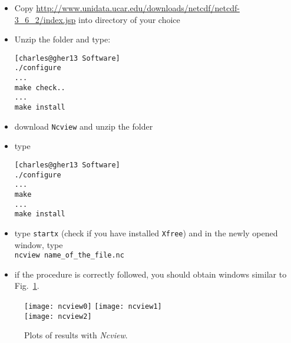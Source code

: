 \begin{itemize}
\item Copy \url{http://www.unidata.ucar.edu/downloads/netcdf/netcdf-3_6_2/index.jsp}  into directory of your choice
\item Unzip the folder  and type:
\begin{lstlisting}[style=Bash]
[charles@gher13 Software]
./configure
...
make check..
...
make install
\end{lstlisting}

\item download \texttt{Ncview} and unzip the folder
\item type\\ 
\begin{lstlisting}[style=Bash]
[charles@gher13 Software]
./configure
...
make 
...
make install
\end{lstlisting}

\item type \texttt{startx} (check if you have installed \texttt{Xfree}) and in the newly opened window, type\\
\texttt{ncview name\_of\_the\_file.nc}

\item if the procedure is correctly followed, you should obtain windows similar to Fig.~\ref{fig:ncview}.
\end{itemize}

\begin{figure}[htpb]
\centering
\texttt{[image: ncview0]}\hspace{.5cm} \texttt{[image: ncview1]} \\
\vspace{.5cm}
\texttt{[image: ncview2]} \caption{Plots of results with \textsl{Ncview}.\label{fig:ncview}}
\end{figure}
